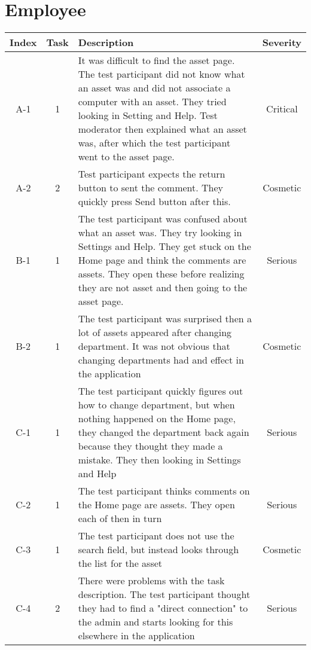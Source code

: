 
\section*{Employee}
\begin{longtable}{| c | c | p{8cm} | c |}
        \hline
        \textbf{Index} & \textbf{Task} & \textbf{Description} & \textbf{Severity}
        \\
        \hline
        A-1 & 1 & It was difficult to find the asset page. The test participant did not know what an asset was and did not associate a computer with an asset. They tried looking in Setting and Help. Test moderator then explained what an asset was, after which the test participant went to the asset page. & Critical
        \\
        \hline
        A-2 & 2 & Test participant expects the return button to sent the comment. They quickly press Send button after this. & Cosmetic
        \\
        \hline
        B-1 & 1 & The test participant was confused about what an asset was. They try looking in Settings and Help. They get stuck on the Home page and think the comments are assets. They open these before realizing they are not asset and then going to the asset page. & Serious
        \\
        \hline
        B-2 & 1 & The test participant was surprised then a lot of assets appeared after changing department. It was not obvious that changing departments had and effect in the application & Cosmetic
        \\
        \hline
        C-1 & 1 & The test participant quickly figures out how to change department, but when nothing happened on the Home page, they changed the department back again because they thought they made a mistake. They then looking in Settings and Help & Serious
        \\
        \hline
        C-2 & 1 & The test participant thinks comments on the Home page are assets. They open each of then in turn & Serious
        \\
        \hline
        C-3 & 1 & The test participant does not use the search field, but instead looks through the list for the asset &  Cosmetic
        \\
        \hline
        C-4 & 2 & There were problems with the task description. The test participant thought they had to find a "direct connection" to the admin and starts looking for this elsewhere in the application & Serious

\end{longtable}
